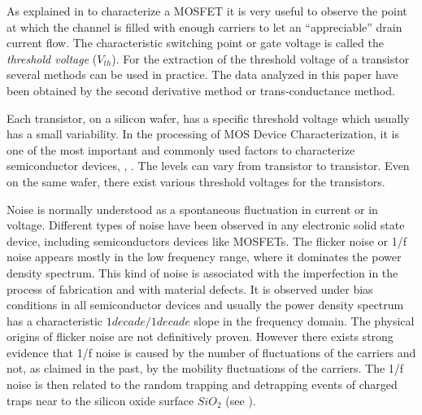 \documentclass[sn-mathphys]{sn-jnl}%
\theoremstyle{thmstyleone}%
\theoremstyle{thmstyletwo}%
\theoremstyle{thmstylethree}%
\begin{document}
As explained in \cite{Schroder2006} to characterize a MOSFET it is very useful to observe the point at which the channel is filled with enough carriers to let an ``appreciable'' drain current flow. The characteristic switching point or gate voltage is called the {\it threshold voltage} ($V_{th}$). For the extraction of the threshold voltage of a transistor several methods can be used in practice. The data analyzed in this paper have been obtained by the second derivative method or trans-conductance method.

Each transistor, on a silicon wafer, has a specific threshold voltage which usually has a small variability. 
In the processing of MOS Device Characterization, it is one of the most important and commonly used factors to characterize semiconductor devices, \cite{Duty2016}, \cite{Schroder2006}. The levels can vary from transistor to transistor. Even on the same wafer, there exist various threshold voltages for the transistors. 

Noise is normally understood as a spontaneous fluctuation in current or in voltage. Different types of noise have been observed in any electronic solid state device, including semiconductors devices like MOSFETs. The flicker noise or 1/f noise appears mostly in the low frequency range, where it dominates the power density spectrum. This kind of noise is associated with the imperfection in the process of fabrication and with material defects. It is observed under bias conditions in all semiconductor devices and usually the power density spectrum has a characteristic $1decade/1decade$ slope in the frequency domain. The physical origins of flicker noise are not definitively proven. However there exists strong evidence that 1/f noise is caused by the number of fluctuations of the carriers and not, as claimed in the past, by the mobility fluctuations of the carriers. The 1/f noise is then related to the random trapping and detrapping events of charged traps near to the silicon oxide surface $SiO_2$ (see \cite{HKHC1990}).\ 
\end{document}
